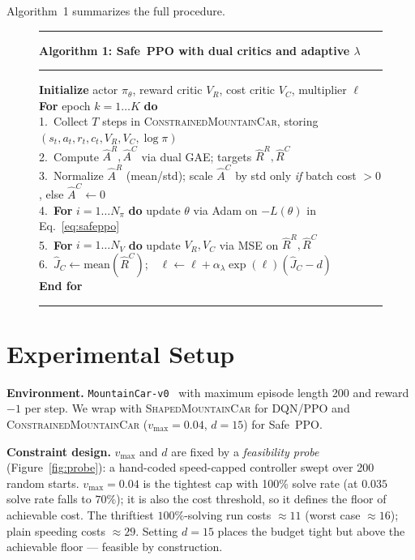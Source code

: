 \documentclass{article}
\newcommand{\eqnref}[1]{Eq.~\eqref{#1}}
\newcommand{\figref}[1]{Figure~\ref{#1}}
\begin{document}
Algorithm~1 summarizes the full procedure.

\begin{figure}[H]
\centering
\begin{minipage}{0.95\linewidth}
\hrule\medskip
\textbf{Algorithm 1: Safe~PPO with dual critics and adaptive $\lambda$}
\medskip\hrule\medskip
\textbf{Initialize} actor $\pi_\theta$, reward critic $V_R$, cost critic $V_C$, multiplier $\ell$ \\[2pt]
\textbf{For} epoch $k = 1 \ldots K$ \textbf{do} \\
\hspace*{1em} 1.\ Collect $T$ steps in \textsc{ConstrainedMountainCar}, storing $(s_t, a_t, r_t, c_t, V_R, V_C, \log\pi)$ \\
\hspace*{1em} 2.\ Compute $\hat{A}^R, \hat{A}^C$ via dual GAE; targets $\hat{R}^R, \hat{R}^C$ \\
\hspace*{1em} 3.\ Normalize $\hat{A}^R$ (mean/std); scale $\hat{A}^C$ by std only \emph{if} batch cost ${>}0$, else $\hat{A}^C \gets 0$ \\
\hspace*{1em} 4.\ \textbf{For} $i = 1 \ldots N_\pi$ \textbf{do} update $\theta$ via Adam on $-L(\theta)$ in \eqnref{eq:safeppo} \\
\hspace*{1em} 5.\ \textbf{For} $i = 1 \ldots N_V$ \textbf{do} update $V_R, V_C$ via MSE on $\hat{R}^R, \hat{R}^C$ \\
\hspace*{1em} 6.\ $\hat{J}_C \gets \mathrm{mean}(\hat{R}^C)$;\ \  $\ell \gets \ell + \alpha_\lambda \exp(\ell)(\hat{J}_C - d)$ \\
\textbf{End for}
\medskip\hrule
\end{minipage}
\end{figure}


\section{Experimental Setup}
\label{sec:setup}

\textbf{Environment.} \texttt{MountainCar-v0}~\citep{brockman2016openaigym} with maximum episode
length 200 and reward $-1$ per step. We wrap with \textsc{ShapedMountainCar} for DQN/PPO and
\textsc{ConstrainedMountainCar} ($v_{\max}{=}0.04$, $d{=}15$) for Safe~PPO.

\textbf{Constraint design.} $v_{\max}$ and $d$ are fixed by a \emph{feasibility probe} (\figref{fig:probe}): a hand-coded speed-capped controller swept over 200 random starts. $v_{\max}{=}0.04$ is the tightest cap with 100\% solve rate (at $0.035$ solve rate falls to $70\%$); it is also the cost threshold, so it defines the floor of achievable cost. The thriftiest $100\%$-solving run costs $\approx 11$ (worst case $\approx 16$); plain speeding costs $\approx 29$. Setting $d{=}15$ places the budget tight but above the achievable floor --- feasible by construction.
\end{document}
